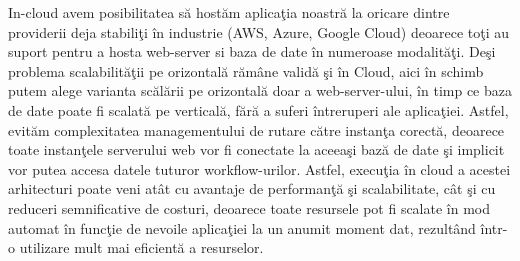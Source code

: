 \documentclass[a4paper,12pt]{report}
\begin{document}
\par In-cloud avem posibilitatea să hostăm aplicaţia noastră la oricare dintre providerii deja stabiliţi în industrie (AWS, Azure, Google Cloud) deoarece toţi au suport pentru a hosta web-server si baza de date în numeroase modalităţi. Deşi problema scalabilităţii pe orizontală rămâne validă şi în Cloud, aici în schimb putem alege varianta scălării pe orizontală doar a web-server-ului, în timp ce baza de date poate fi scalată pe verticală, fără a suferi întreruperi ale aplicaţiei. Astfel, evităm complexitatea managementului de rutare către instanţa corectă, deoarece toate instanţele serverului web vor fi conectate la aceeaşi bază de date şi implicit vor putea accesa datele tuturor workflow-urilor. Astfel, execuţia în cloud a acestei arhitecturi poate veni atât cu avantaje de performanţă şi scalabilitate, cât şi cu reduceri semnificative de costuri, deoarece toate resursele pot fi scalate în mod automat în funcţie de nevoile aplicaţiei la un anumit moment dat, rezultând într-o utilizare mult mai eficientă a resurselor. 
\end{document}

